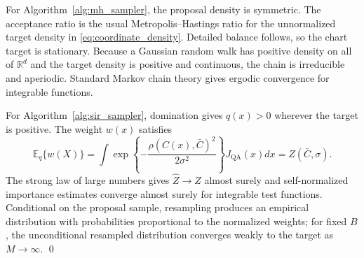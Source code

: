 \documentclass[
  12pt]{article}
\newcommand{\E}{\mathbb E}
\newcommand{\R}{\mathbb R}
\newcommand{\QA}{\mathrm{QA}}
\begin{document}
For Algorithm~\ref{alg:mh_sampler}, the proposal density is symmetric. The acceptance ratio is the usual Metropolis--Hastings ratio for the unnormalized target density in \eqref{eq:coordinate_density}. Detailed balance follows, so the chart target is stationary. Because a Gaussian random walk has positive density on all of $\R^d$ and the target density is positive and continuous, the chain is irreducible and aperiodic. Standard Markov chain theory gives ergodic convergence for integrable functions.

For Algorithm~\ref{alg:sir_sampler}, domination gives $q(x)>0$ wherever the target is positive. The weight $w(x)$ satisfies
\[
\E_q\{w(X)\}=\int \exp\left\{-\frac{\rho(C(x),\bar C)^2}{2\sigma^2}\right\}J_{\QA}(x)dx=Z(\bar C,\sigma).
\]
The strong law of large numbers gives $\widehat Z\to Z$ almost surely and self-normalized importance estimates converge almost surely for integrable test functions. Conditional on the proposal sample, resampling produces an empirical distribution with probabilities proportional to the normalized weights; for fixed $B$, the unconditional resampled distribution converges weakly to the target as $M\to\infty$. \qed
 

\end{document}
